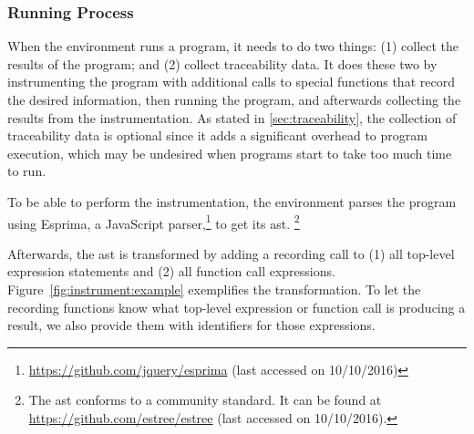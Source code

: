 %


\subsubsection{Running Process}
When the environment runs a program, it needs to do two things: (1) collect the results of the program; and (2) collect traceability data.
It does these two by instrumenting the program with additional calls to special functions that record the desired information, then running the program, and afterwards collecting the results from the instrumentation.
As stated in \ref{sec:traceability}, the collection of traceability data is optional since it adds a significant overhead to program execution, which may be undesired when programs start to take too much time to run.

To be able to perform the instrumentation, the environment parses the program using Esprima, a JavaScript parser,\footnote{\url{https://github.com/jquery/esprima} (last accessed on 10/10/2016)} to get its \gls{ast}.%
\footnote{The \gls{ast} conforms to a community standard. It can be found at \url{https://github.com/estree/estree} (last accessed on 10/10/2016).}

Afterwards, the \gls{ast} is transformed by adding a recording call to (1) all top-level expression statements and (2) all function call expressions.
Figure~\ref{fig:instrument:example} exemplifies the transformation.
To let the recording functions know what top-level expression or function call is producing a result, we also provide them with identifiers for those expressions.

